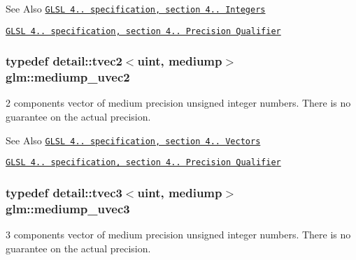 \begin{DoxySeeAlso}{See Also}
\href{http://www.opengl.org/registry/doc/GLSLangSpec.4.20.8.pdf}{\tt G\-L\-S\-L 4.. specification, section 4.. Integers} 

\href{http://www.opengl.org/registry/doc/GLSLangSpec.4.20.8.pdf}{\tt G\-L\-S\-L 4.. specification, section 4.. Precision Qualifier} 
\end{DoxySeeAlso}
\hypertarget{group__core__precision_ga15c8fb77bdb6763ef73b39e02eb98a56}{
\subsubsection[{mediump\-\_\-uvec2}]{\setlength{\rightskip}{0pt plus 5cm}typedef detail\-::tvec2$<$uint, mediump$>$ {\bf glm\-::mediump\-\_\-uvec2}}}\label{group__core__precision_ga15c8fb77bdb6763ef73b39e02eb98a56}
2 components vector of medium precision unsigned integer numbers. There is no guarantee on the actual precision.

\begin{DoxySeeAlso}{See Also}
\href{http://www.opengl.org/registry/doc/GLSLangSpec.4.20.8.pdf}{\tt G\-L\-S\-L 4.. specification, section 4.. Vectors} 

\href{http://www.opengl.org/registry/doc/GLSLangSpec.4.20.8.pdf}{\tt G\-L\-S\-L 4.. specification, section 4.. Precision Qualifier} 
\end{DoxySeeAlso}
\hypertarget{group__core__precision_gaebdefe98b08421ef645f65c706af46b2}{
\subsubsection[{mediump\-\_\-uvec3}]{\setlength{\rightskip}{0pt plus 5cm}typedef detail\-::tvec3$<$uint, mediump$>$ {\bf glm\-::mediump\-\_\-uvec3}}}\label{group__core__precision_gaebdefe98b08421ef645f65c706af46b2}
3 components vector of medium precision unsigned integer numbers. There is no guarantee on the actual precision.

